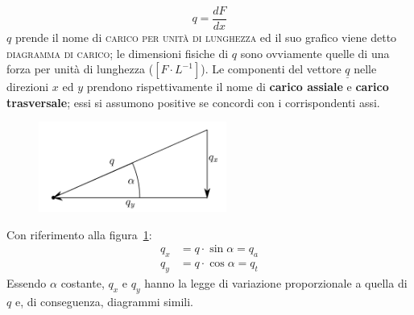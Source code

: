 \begin{equation*}
\boxed{q = \frac{dF}{dx}}
\end{equation*}
$q$ prende il nome di \textsc{carico per unità di lunghezza} ed il suo grafico viene detto \textsc{diagramma di carico}; le dimensioni fisiche di $q$ sono ovviamente quelle di una forza per unità di lunghezza ($[F \cdot L^{-1}]$). Le componenti del vettore $\underline{q}$ nelle direzioni $x$ ed $y$ prendono rispettivamente il nome di \textbf{carico assiale} e \textbf{carico trasversale}; essi si assumono positive se concordi con i corrispondenti assi. 
\renewcommand{\thefigure}{10~-~2}
\begin{figure}[ht]
\centering
\includegraphics[width=0.55\textwidth]{Immagini/Parte_10/Figura10_2/figura10_2.pdf}
\caption{}
\label{figura10-2}
\end{figure}
Con riferimento alla figura~\ref{figura10-2}:
\begin{align}
q_x &= q\cdot \sin{\alpha} = q_a \label{equazione10.2a} \tag{10.2a}\\ 
q_y &= q\cdot \cos{\alpha} = q_t \label{equazione10.2b} \tag{10.2b}
\end{align}
Essendo $\alpha$ costante, $q_x$ e $q_y$ hanno la legge di variazione proporzionale a quella di $q$ e, di conseguenza, diagrammi simili.
